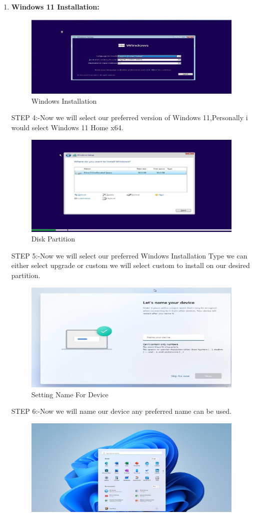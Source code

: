 \documentclass[a4paper,9pt]{article}
\begin{document}
\begin{enumerate}
		\item \textbf{Windows 11 Installation:} 
			\begin{figure}[H]
			\centering
			\includegraphics[width=0.8\linewidth]{1.4.png}
			\caption{Windows Installation}
		\end{figure}
		STEP 4:-Now we will select our preferred version of Windows 11,Personally i would select Windows 11 Home x64.
			\begin{figure}[H]
			\centering
			\includegraphics[width=0.8\linewidth]{1.5.png}
			\caption{Disk Partition}
		\end{figure}
		STEP 5:-Now we will select our preferred Windows Installation Type we can either select upgrade or custom we will select custom to install on our desired partition.
			\begin{figure}[H]
			\centering
			\includegraphics[width=0.8\linewidth]{1.6.png}
			\caption{Setting Name For Device}
		\end{figure}
		STEP 6:-Now we will name our device any preferred name can be used.
			\begin{figure}[H]
			\centering
			\includegraphics[width=0.8\linewidth]{1.7.png}

\end{figure}
\end{enumerate}
\end{document}
